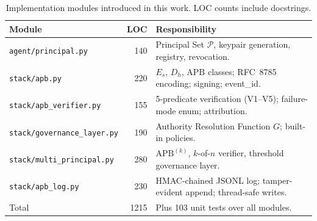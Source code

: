 \documentclass[11pt]{article}
\newcommand{\Pset}{\mathcal{P}}
\newcommand{\Es}{E_s}
\newcommand{\Dh}{D_h}
\newcommand{\APB}{\mathrm{APB}}
\begin{document}
\begin{table}[t]
\centering
\caption{Implementation modules introduced in this work.
LOC counts include docstrings.}
\label{tab:modules}
\small
\begin{tabular}{lrl}
\toprule
Module & LOC & Responsibility \\
\midrule
\texttt{agent/principal.py}        & 140 & Principal Set $\Pset$, keypair generation, registry, revocation. \\
\texttt{stack/apb.py}              & 220 & $\Es$, $\Dh$, $\APB$ classes; RFC~8785 encoding; signing; event\_id. \\
\texttt{stack/apb\_verifier.py}    & 155 & 5-predicate verification (V1--V5); failure-mode enum; attribution. \\
\texttt{stack/governance\_layer.py}& 190 & Authority Resolution Function $G$; built-in policies. \\
\texttt{stack/multi\_principal.py} & 280 & $\APB^{(k)}$, $k$-of-$n$ verifier, threshold governance layer. \\
\texttt{stack/apb\_log.py}         & 230 & HMAC-chained JSONL log; tamper-evident append; thread-safe writes. \\
\midrule
Total                              & 1215 & Plus 103 unit tests over all modules. \\
\bottomrule
\end{tabular}
\end{table}
\end{document}

